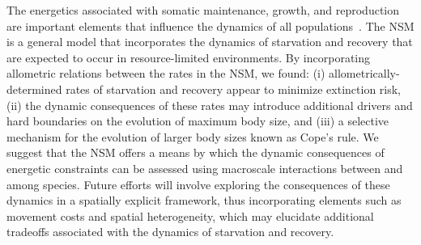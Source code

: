 \documentclass[twocolumn,preprintnumbers,amsmath,amssymb,superscriptaddress]{revtex4}
\begin{document}
The energetics associated with somatic maintenance, growth, and reproduction are important elements that influence the dynamics of all populations~\citep{Stearns:1989ip}.
The NSM is a general model that incorporates the dynamics of starvation and recovery that are expected to occur in resource-limited environments.
By incorporating allometric relations between the rates in the NSM, we found: (i) allometrically-determined rates of starvation and recovery appear to minimize extinction risk, (ii) the dynamic consequences of these rates may introduce additional drivers and hard boundaries on the evolution of maximum body size, and (iii) a selective mechanism for the evolution of larger body sizes known as Cope's rule.
We suggest that the NSM offers a means by which the dynamic consequences of energetic constraints can be assessed using macroscale interactions between and among species.
Future efforts will involve exploring the consequences of these dynamics in a spatially explicit framework, thus incorporating elements such as movement costs and spatial heterogeneity, which may elucidate additional tradeoffs associated with the dynamics of starvation and recovery.
\end{document}
